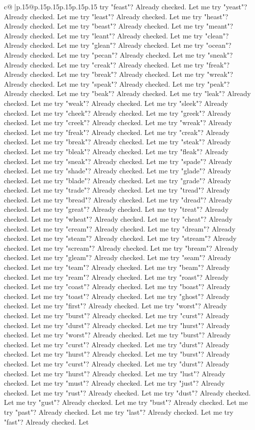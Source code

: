 \documentclass{article}
\begin{document}
{\begin{supertabular}{c@{$\;$}|p{.15\linewidth}@{}p{.15\linewidth}p{.15\linewidth}p{.15\linewidth}p{.15\linewidth}p{.15\linewidth}}
{{{try "feast"? Already checked. Let me try "yeast"? Already checked. Let me try "least"? Already checked. Let me try "heast"? Already checked. Let me try "beast"? Already checked. Let me try "meant"? Already checked. Let me try "leant"? Already checked. Let me try "clean"? Already checked. Let me try "glean"? Already checked. Let me try "ocean"? Already checked. Let me try "pecan"? Already checked. Let me try "sneak"? Already checked. Let me try "creak"? Already checked. Let me try "freak"? Already checked. Let me try "break"? Already checked. Let me try "wreak"? Already checked. Let me try "speak"? Already checked. Let me try "peak"? Already checked. Let me try "beak"? Already checked. Let me try "leak"? Already checked. Let me try "weak"? Already checked. Let me try "sleek"? Already checked. Let me try "cheek"? Already checked. Let me try "greek"? Already checked. Let me try "creek"? Already checked. Let me try "wreak"? Already checked. Let me try "freak"? Already checked. Let me try "creak"? Already checked. Let me try "break"? Already checked. Let me try "steak"? Already checked. Let me try "bleak"? Already checked. Let me try "fleak"? Already checked. Let me try "sneak"? Already checked. Let me try "spade"? Already checked. Let me try "shade"? Already checked. Let me try "glade"? Already checked. Let me try "blade"? Already checked. Let me try "grade"? Already checked. Let me try "trade"? Already checked. Let me try "tread"? Already checked. Let me try "bread"? Already checked. Let me try "dread"? Already checked. Let me try "great"? Already checked. Let me try "treat"? Already checked. Let me try "wheat"? Already checked. Let me try "cheat"? Already checked. Let me try "cream"? Already checked. Let me try "dream"? Already checked. Let me try "steam"? Already checked. Let me try "stream"? Already checked. Let me try "scream"? Already checked. Let me try "bream"? Already checked. Let me try "gleam"? Already checked. Let me try "seam"? Already checked. Let me try "team"? Already checked. Let me try "beam"? Already checked. Let me try "ream"? Already checked. Let me try "roast"? Already checked. Let me try "coast"? Already checked. Let me try "boast"? Already checked. Let me try "toast"? Already checked. Let me try "ghost"? Already checked. Let me try "first"? Already checked. Let me try "worst"? Already checked. Let me try "burst"? Already checked. Let me try "curst"? Already checked. Let me try "durst"? Already checked. Let me try "hurst"? Already checked. Let me try "worst"? Already checked. Let me try "burst"? Already checked. Let me try "curst"? Already checked. Let me try "durst"? Already checked. Let me try "hurst"? Already checked. Let me try "burst"? Already checked. Let me try "curst"? Already checked. Let me try "durst"? Already checked. Let me try "hurst"? Already checked. Let me try "lust"? Already checked. Let me try "must"? Already checked. Let me try "just"? Already checked. Let me try "rust"? Already checked. Let me try "dust"? Already checked. Let me try "gust"? Already checked. Let me try "bust"? Already checked. Let me try "past"? Already checked. Let me try "last"? Already checked. Let me try "fast"? Already checked. Let }}}
\end{supertabular}}
\end{document}
